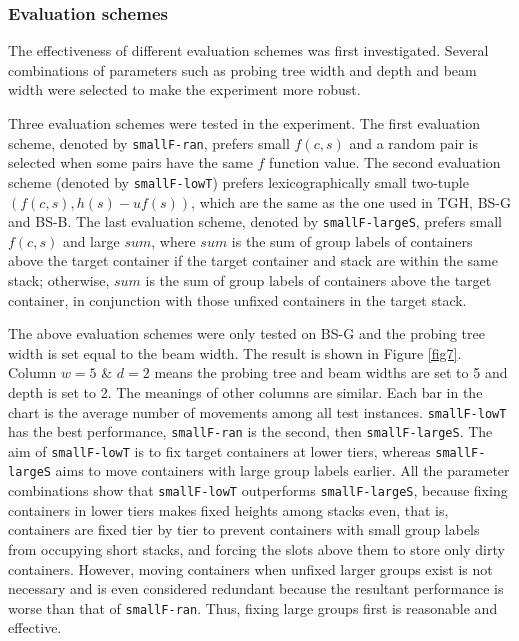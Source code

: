 \documentclass[review,3p,times,authoryear,12pt]{elsarticle}
\begin{document}
\subsubsection{Evaluation schemes}

The effectiveness of different evaluation schemes was first investigated.
Several combinations of parameters such as probing tree width and depth and beam width were selected to make the experiment more robust.

Three evaluation schemes were tested in the experiment.
The first evaluation scheme, denoted by \texttt{smallF-ran}, prefers small $f(c,s)$ and a random pair is selected when some pairs have the same $f$ function value.
The second evaluation scheme (denoted by \texttt{smallF-lowT}) prefers lexicographically small two-tuple $(f(c,s),h(s)-\mathit{uf}(s))$, which are the same as the one used in TGH, BS-G and BS-B.
The last evaluation scheme, denoted by \texttt{smallF-largeS}, prefers small $f(c,s)$ and large $\mathit{sum}$, where $\mathit{sum}$ is the sum of group labels of containers above the target container if the target container and stack are within the same stack; otherwise, $\mathit{sum}$ is the sum of group labels of containers above the target container, in conjunction with those unfixed containers in the target stack.

The above evaluation schemes were only tested on BS-G and the probing tree width is set equal to the beam width.
The result is shown in Figure \ref{fig7}.
Column $w=5$ \& $d=2$ means the probing tree and beam widths are set to 5 and depth is set to 2.
The meanings of other columns are similar.
Each bar in the chart is the average number of movements among all test instances.
\texttt{smallF-lowT} has the best performance, \texttt{smallF-ran} is the second, then \texttt{smallF-largeS}.
The aim of \texttt{smallF-lowT} is to fix target containers at lower tiers, whereas \texttt{smallF-largeS} aims to move containers with large group labels earlier.
All the parameter combinations show that \texttt{smallF-lowT} outperforms \texttt{smallF-largeS}, because fixing containers in lower tiers makes fixed heights among stacks even, that is, containers are fixed tier by tier to prevent containers with small group labels from occupying short stacks, and forcing the slots above them to store only dirty containers.
However, moving containers when unfixed larger groups exist is not necessary and is even considered redundant because the resultant performance is worse than that of \texttt{smallF-ran}.
Thus, fixing large groups first is reasonable and effective.
\end{document}
